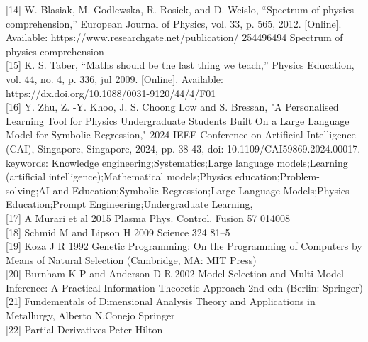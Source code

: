 \documentclass{article}
\begin{document}
[14] W. Blasiak, M. Godlewska, R. Rosiek, and D. Wcislo, “Spectrum of
physics comprehension,” European Journal of Physics, vol. 33, p. 565,
2012. [Online]. Available: https://www.researchgate.net/publication/
254496494 Spectrum of physics comprehension\\

[15] K. S. Taber, “Maths should be the last thing we teach,” Physics
Education, vol. 44, no. 4, p. 336, jul 2009. [Online]. Available:
https://dx.doi.org/10.1088/0031-9120/44/4/F01\\ 

[16] Y. Zhu, Z. -Y. Khoo, J. S. Choong Low and S. Bressan, "A Personalised Learning Tool for Physics Undergraduate Students Built On a Large Language Model for Symbolic Regression," 2024 IEEE Conference on Artificial Intelligence (CAI), Singapore, Singapore, 2024, pp. 38-43, doi: 10.1109/CAI59869.2024.00017. keywords: {Knowledge engineering;Systematics;Large language models;Learning (artificial intelligence);Mathematical models;Physics education;Problem-solving;AI and Education;Symbolic Regression;Large Language Models;Physics Education;Prompt Engineering;Undergraduate Learning},\\

[17]  A Murari et al 2015 Plasma Phys. Control. Fusion 57 014008\\

[18]  Schmid M and Lipson H 2009 Science 324 81–5\\ 

[19] Koza J R 1992 Genetic Programming: On the Programming
of Computers by Means of Natural Selection (Cambridge,
MA: MIT Press)\\

[20] Burnham K P and Anderson D R 2002 Model Selection and
Multi-Model Inference: A Practical Information-Theoretic
Approach 2nd edn (Berlin: Springer)\\ 

[21] Fundementals of Dimensional Analysis Theory and Applications in Metallurgy, Alberto N.Conejo Springer\\ 

[22] Partial Derivatives Peter Hilton\\
\end{document}
